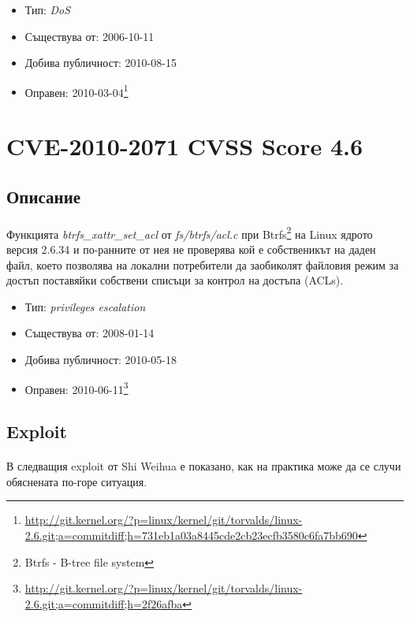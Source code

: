 \documentclass[a4paper,12pt,leqno]{article}
\begin{document}
\begin{itemize}
    \item Тип: \textit{DoS}
    \item Съществува от: 2006-10-11
  	\item Добива публичност: 2010-08-15
    \item Оправен: 2010-03-04\footnote{\url{http://git.kernel.org/?p=linux/kernel/git/torvalds/linux-2.6.git;a=commitdiff;h=731eb1a03a8445cde2cb23ecfb3580c6fa7bb690}}
\end{itemize}

\section{CVE-2010-2071 CVSS Score 4.6}
\subsection{Описание}
\paragraph{}
Функцията \textit{btrfs\_xattr\_set\_acl} от \textit{fs/btrfs/acl.c} при Btrfs\footnote{Btrfs - B-tree file system}
 на  Linux ядрото версия 
2.6.34 и по-ранните от нея не проверява кой е собственикът на даден файл, 
което позволява на локални потребители да заобиколят файловия режим за 
достъп поставяйки собствени списъци за контрол на достъпа (ACLs).

\begin{itemize}
    \item Тип: \textit{privileges escalation}
    \item Съществува от: 2008-01-14
  	\item Добива публичност: 2010-05-18
    \item Оправен: 2010-06-11\footnote{\url{http://git.kernel.org/?p=linux/kernel/git/torvalds/linux-2.6.git;a=commitdiff;h=2f26afba}}
\end{itemize}

\subsection{Exploit}
\paragraph{}
В следващия exploit от Shi Weihua е показано, как на практика може да се 
случи обяснената по-горе ситуация.
\end{document}
